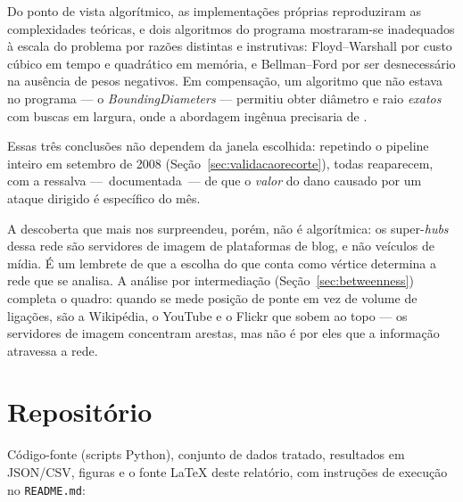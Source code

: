 \documentclass[sigconf]{webmedia}
\begin{document}
Do ponto de vista algorítmico, as implementações próprias reproduziram as
complexidades teóricas, e dois algoritmos do programa mostraram-se
inadequados à escala do problema por razões distintas e instrutivas:
Floyd--Warshall por custo cúbico em tempo e quadrático em memória, e
Bellman--Ford por ser desnecessário na ausência de pesos negativos. Em
compensação, um algoritmo que não estava no programa --- o
\textit{BoundingDiameters} --- permitiu obter diâmetro e raio
\emph{exatos} com \bfsDiametro{} buscas em largura, onde a abordagem
ingênua precisaria de \tamCG{}.

Essas três conclusões não dependem da janela escolhida: repetindo o
pipeline inteiro em setembro de 2008
(Seção~\ref{sec:validacaorecorte}), todas reaparecem, com a ressalva
---~documentada~--- de que o \emph{valor} do dano causado por um ataque
dirigido é específico do mês.

A descoberta que mais nos surpreendeu, porém, não é algorítmica: os
super-\textit{hubs} dessa rede são servidores de imagem de plataformas de
blog, e não veículos de mídia. É um lembrete de que a escolha do que conta
como vértice determina a rede que se analisa. A análise por intermediação
(Seção~\ref{sec:betweenness}) completa o quadro: quando se mede posição
de ponte em vez de volume de ligações, são a Wikipédia, o YouTube e o
Flickr que sobem ao topo --- os servidores de imagem concentram arestas,
mas não é por eles que a informação atravessa a rede.

\section{Repositório}
\label{sec:repositorio}

Código-fonte (scripts Python), conjunto de dados tratado, resultados em
JSON/CSV, figuras e o fonte \LaTeX{} deste relatório, com instruções de
execução no \texttt{README.md}:

\begin{center}
\end{center}
\end{document}
